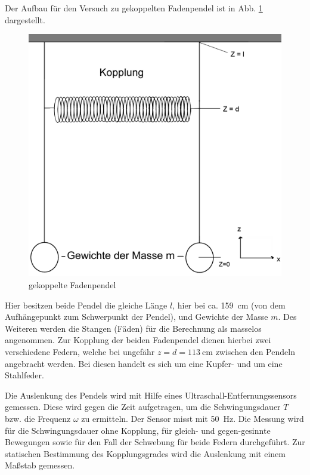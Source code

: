\documentclass[11pt,a4paper,titlepage, ngerman]{article}
\newcommand{\refabb}[1]{Abb. \ref{abb:#1}}
\begin{document}
			Der Aufbau für den Versuch zu gekoppelten Fadenpendel ist in \refabb{gFadenpendel} dargestellt. 
			\begin{figure}[ht]
				\centering
				\includegraphics[width=\textwidth]{gFadenpendel.png}
				\caption{gekoppelte Fadenpendel}
				\label{abb:gFadenpendel}	
			\end{figure}
			Hier besitzen beide Pendel die gleiche Länge $l$, hier bei ca. \SI{159}{\cm} (von dem Aufhängepunkt zum Schwerpunkt der Pendel), und Gewichte der Masse $m$. Des Weiteren werden die Stangen (\glqq Fäden\grqq) für die Berechnung als masselos angenommen. Zur Kopplung der beiden Fadenpendel dienen hierbei zwei verschiedene Federn, welche bei ungefähr $z=d=\SI{113}{\cm}$ zwischen den Pendeln angebracht werden. Bei diesen handelt es sich um eine Kupfer- und um eine Stahlfeder.
			
			Die Auslenkung des Pendels wird mit Hilfe eines Ultraschall-Entfernungssensors gemessen. Diese wird gegen die Zeit aufgetragen, um die Schwingungsdauer $T$ bzw. die Frequenz $\omega$ zu ermitteln. Der Sensor misst mit \SI{50}{\Hz}. Die Messung wird für die Schwingungsdauer ohne Kopplung, für gleich- und gegen-gesinnte Bewegungen sowie für den Fall der Schwebung für beide Federn durchgeführt.
			Zur statischen Bestimmung des Kopplungsgrades wird die Auslenkung mit einem Maßstab gemessen. 
\end{document}
